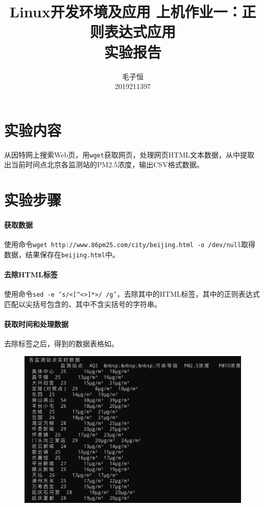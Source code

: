 \documentclass[lang=cn,11pt,a4paper,cite=authornum]{paper}
\title{Linux开发环境及应用 上机作业一：正则表达式应用 \\ 实验报告}
\author{毛子恒 \\ 2019211397}
\institute{北京邮电大学\ 计算机学院}
\date{\zhtoday}
\begin{document}
\maketitle

\section{实验内容}

从因特网上搜索Web页，用\texttt{wget}获取网页，处理网页HTML文本数据，从中提取出当前时间点北京各监测站的PM2.5浓度，输出CSV格式数据。

\section{实验步骤}

\paragraph{获取数据}

使用命令\texttt{wget http://www.86pm25.com/city/beijing.html -o /dev/null}取得数据，结果保存在\texttt{beijing.html}中。

\paragraph{去除HTML标签}

使用命令\texttt{sed -e 's/<[^<>]*>/ /g'}，去除其中的HTML标签，其中的正则表达式匹配以尖括号包含的、其中不含尖括号的字符串。

\paragraph{获取时间和处理数据}

去除标签之后，得到的数据表格如。

\begin{figure}[!htb]
    \centering
    \includegraphics[width=\textwidth]{./images/l1-p1.jpg}
    \caption{\label{fig:p1}}
\end{figure}
\end{document}

